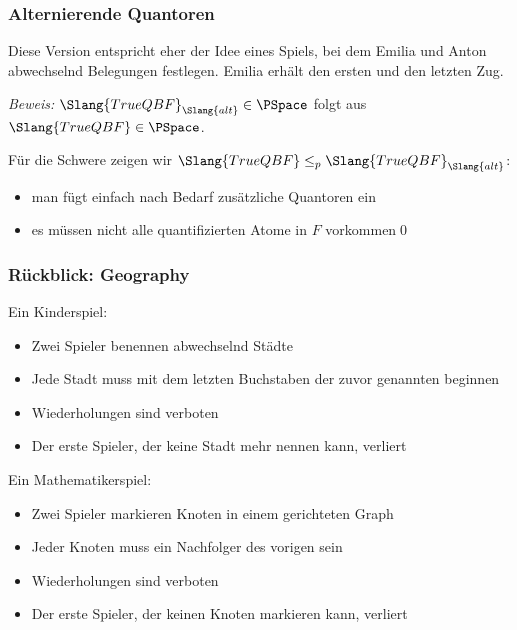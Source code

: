 \documentclass[aspectratio=1610,onlymath]{beamer}
\begin{document}
\begin{frame}\frametitle{Alternierende Quantoren}



Diese Version entspricht eher der Idee eines Spiels, bei dem Emilia und Anton abwechselnd
Belegungen festlegen. Emilia erhält den ersten und den letzten Zug.\bigskip\pause


\pause\emph{Beweis:} $\Slang{TrueQBF}_{\Slang{alt}}\in\PSpace$ folgt aus $\Slang{TrueQBF}\in\PSpace$.\bigskip

Für die Schwere zeigen wir $\Slang{TrueQBF}\leq_p\Slang{TrueQBF}_{\Slang{alt}}$:
\begin{itemize}
\item man fügt einfach nach Bedarf zusätzliche Quantoren ein
\item es müssen nicht alle quantifizierten Atome in $F$ vorkommen\qed
\end{itemize}

\end{frame}

\begin{frame}\frametitle{Rückblick: Geography}

\alert{Ein Kinderspiel:}
\begin{itemize}
\item Zwei Spieler benennen abwechselnd Städte
\item Jede Stadt muss mit dem letzten Buchstaben der zuvor genannten beginnen
\item Wiederholungen sind verboten
\item Der erste Spieler, der keine Stadt mehr nennen kann, verliert
\end{itemize}
\smallskip

\alert{Ein Mathematikerspiel:}
\begin{itemize}
\item Zwei Spieler markieren Knoten in einem gerichteten Graph
\item Jeder Knoten muss ein Nachfolger des vorigen sein
\item Wiederholungen sind verboten
\item Der erste Spieler, der keinen Knoten markieren kann, verliert
\end{itemize}
\smallskip

{}

\end{frame}
\end{document}
